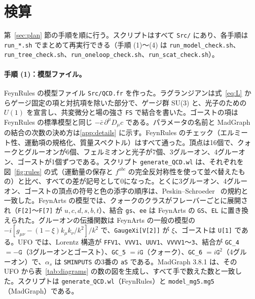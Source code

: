\documentclass[a4paper,10pt]{ltjsarticle}
\begin{document}
\section{検算}\label{sec:checks}

第~\ref{sec:plan} 節の手順を順に行う。スクリプトはすべて \texttt{Src/} にあり、各手順は \texttt{run\_*.sh} でまとめて再実行できる（手順 (1)〜(4) は \texttt{run\_model\_check.sh}、\texttt{run\_tree\_check.sh}、\texttt{run\_oneloop\_check.sh}、\texttt{run\_scat\_check.sh}）。

\paragraph{手順 (1)：模型ファイル。}FeynRules の模型ファイル \texttt{Src/QCD.fr} を作った。ラグランジアンは式~\eqref{eq:L} からゲージ固定の項と対抗項を除いた部分で、ゲージ群 SU(3) と、光子のための $U(1)$ を宣言し、共変微分と場の強さ \texttt{FS} で結合を書いた。ゴーストの項は FeynRules の標準模型と同じ $-\bar c\,\partial^\mu D_\mu c$ である。パラメータの名前と MadGraph の結合の次数の決め方は\ref{app:details} に示す。FeynRules のチェック（エルミート性、運動項の規格化、質量スペクトル）はすべて通った。頂点は16個で、クォークとグルーオンが6個、フェルミオンと光子が7個、3グルーオン、4グルーオン、ゴーストが1個ずつである。スクリプト \texttt{generate\_QCD.wl} は、それぞれを図~\ref{fig:rules} の式（運動量の保存と $f^{abc}$ の完全反対称性を使って並べ替えたもの）と比べ、すべての差が記号として0になった。とくに3グルーオン、4グルーオン、ゴーストの頂点の符号と色の添字の順序は、Peskin--Schroeder~\cite{peskin} の規約と一致した。FeynArts の模型では、クォークのクラスがフレーバーごとに展開され（\texttt{F[2]}〜\texttt{F[7]} が $u,c,d,s,b,t$）、結合 \texttt{gs}、\texttt{ee} は FeynArts の \texttt{GS}、\texttt{EL} に置き換えられた。グルーオンの伝播関数は FeynArts の一般の模型の $-i[g_{\mu\nu}-(1-\xi)k_\mu k_\nu/k^2]/k^2$ で、\texttt{GaugeXi[V[2]]} が $\xi$、ゴーストは \texttt{U[1]} である。UFO では、Lorentz 構造が \texttt{FFV1}、\texttt{VVV1}、\texttt{UUV1}、\texttt{VVVV1}〜\texttt{3}、結合が \texttt{GC\_4} $=-\texttt G$（3グルーオンとゴースト）、\texttt{GC\_5} $=i\texttt G$（クォーク）、\texttt{GC\_6} $=i\texttt G^2$（4グルーオン）で、$\alpha_s$ は \texttt{SMINPUTS} の3番の \texttt{aS} である。MadGraph 3.8.1 は、その UFO から表~\ref{tab:diagrams} の数の図を生成し、すべて手で数えた数と一致した。スクリプトは \texttt{generate\_QCD.wl}（FeynRules）と \texttt{model\_mg5.mg5}（MadGraph）である。
\end{document}
